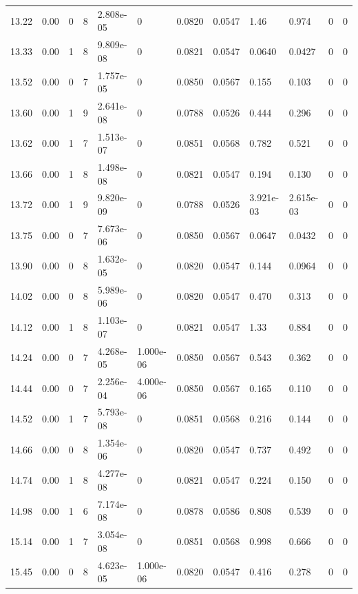 \documentclass[preview]{standalone}
\begin{document}
{{{{\begin{tabular}{L{1.2cm}C{1.2cm} C{0.3cm}C{0.5cm} C{1.4cm}C{1.4cm} C{1.4cm}C{1.4cm} C{1.6cm}C{1.6cm} C{1.6cm}C{1.6cm}}
  13.22  &  0.00  & 0     &  8 &  2.808e-05  & 0  &  0.0820&   0.0547& 1.46 & 0.974   &  0 & 0  \\ 
  13.33  &  0.00  & 1     &  8 &  9.809e-08  & 0  &  0.0821&   0.0547& 0.0640 & 0.0427   &  0 & 0  \\ 
  13.52  &  0.00  & 0     &  7 &  1.757e-05  & 0  &  0.0850&   0.0567& 0.155 & 0.103   &  0 & 0  \\ 
  13.60  &  0.00  & 1     &  9 &  2.641e-08  & 0  &  0.0788&   0.0526& 0.444 & 0.296   &  0 & 0  \\ 
  13.62  &  0.00  & 1     &  7 &  1.513e-07  & 0  &  0.0851&   0.0568& 0.782 & 0.521   &  0 & 0  \\ 
  13.66  &  0.00  & 1     &  8 &  1.498e-08  & 0  &  0.0821&   0.0547& 0.194 & 0.130   &  0 & 0  \\ 
  13.72  &  0.00  & 1     &  9 &  9.820e-09  & 0  &  0.0788&   0.0526& 3.921e-03 & 2.615e-03   &  0 & 0  \\ 
  13.75  &  0.00  & 0     &  7 &  7.673e-06  & 0  &  0.0850&   0.0567& 0.0647 & 0.0432   &  0 & 0  \\ 
  13.90  &  0.00  & 0     &  8 &  1.632e-05  & 0  &  0.0820&   0.0547& 0.144 & 0.0964   &  0 & 0  \\ 
  14.02  &  0.00  & 0     &  8 &  5.989e-06  & 0  &  0.0820&   0.0547& 0.470 & 0.313   &  0 & 0  \\ 
  14.12  &  0.00  & 1     &  8 &  1.103e-07  & 0  &  0.0821&   0.0547& 1.33 & 0.884   &  0 & 0  \\ 
  14.24  &  0.00  & 0     &  7 &  4.268e-05  & 1.000e-06  &  0.0850&   0.0567& 0.543 & 0.362   &  0 & 0  \\ 
  14.44  &  0.00  & 0     &  7 &  2.256e-04  & 4.000e-06  &  0.0850&   0.0567& 0.165 & 0.110   &  0 & 0  \\ 
  14.52  &  0.00  & 1     &  7 &  5.793e-08  & 0  &  0.0851&   0.0568& 0.216 & 0.144   &  0 & 0  \\ 
  14.66  &  0.00  & 0     &  8 &  1.354e-06  & 0  &  0.0820&   0.0547& 0.737 & 0.492   &  0 & 0  \\ 
  14.74  &  0.00  & 1     &  8 &  4.277e-08  & 0  &  0.0821&   0.0547& 0.224 & 0.150   &  0 & 0  \\ 
  14.98  &  0.00  & 1     &  6 &  7.174e-08  & 0  &  0.0878&   0.0586& 0.808 & 0.539   &  0 & 0  \\ 
  15.14  &  0.00  & 1     &  7 &  3.054e-08  & 0  &  0.0851&   0.0568& 0.998 & 0.666   &  0 & 0  \\ 
  15.45  &  0.00  & 0     &  8 &  4.623e-05  & 1.000e-06  &  0.0820&   0.0547& 0.416 & 0.278   &  0 & 0  \\ 

\end{tabular}}}}}
\end{document}
